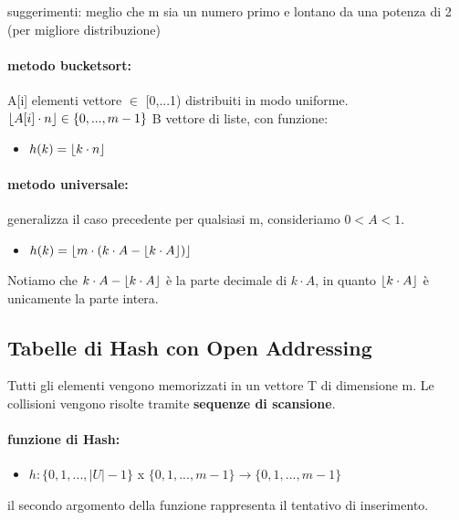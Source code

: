 \documentclass{article}
\DeclarePairedDelimiter\floor{\lfloor}{\rfloor}
\begin{document}
suggerimenti: meglio che m sia un numero primo e lontano da una potenza di 2 (per migliore distribuzione)

\paragraph{metodo bucketsort:} A[i] elementi vettore $\in$ [0,...1) distribuiti in modo uniforme. 
$\floor{A[i] \cdot n} \in \{0,..., m-1\}$ B vettore di liste, con funzione:
\begin{itemize}
    \item $h(k) = \floor{k \cdot n}$
\end{itemize}

\paragraph{metodo universale:} generalizza il caso precedente per qualsiasi m, consideriamo $0 < A < 1$.
\begin{itemize}
    \item $h(k) = \floor{m \cdot (k \cdot A - \floor{k \cdot A})}$
\end{itemize}
Notiamo che $k \cdot A - \floor{k \cdot A}$ è la parte decimale di $k \cdot A$, in quanto $\floor{k \cdot A}$ è unicamente la parte intera.

\subsection{Tabelle di Hash con Open Addressing} %

Tutti gli elementi vengono memorizzati in un vettore T di dimensione m. Le collisioni vengono risolte 
tramite \textbf{sequenze di scansione}.

\paragraph{funzione di Hash:} 
\begin{itemize}
    \item $h: \{ 0,1,...,|U|-1 \}$ x $\{0,1,...,m-1\}\rightarrow \{0,1,...,m-1\}$
\end{itemize}

il secondo argomento della funzione rappresenta il tentativo di inserimento.
\end{document}
